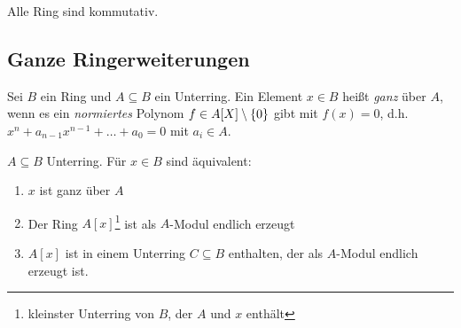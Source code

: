 \documentclass[../main.tex]{subfiles}
\begin{document}
Alle Ring sind kommutativ.
\subsection{Ganze Ringerweiterungen}
\begin{definition}
    Sei $B$ ein Ring und $A\subseteq B$ ein Unterring. Ein Element $x\in B$ heißt \emph{ganz} über $A$, wenn es ein \emph{normiertes} Polynom $f\in A[X]\setminus \{0\}$ gibt mit $f(x)=0$, d.h. $x^n + a_{n-1}x^{n-1} + \dots + a_0 = 0$ mit $a_i\in A$.
\end{definition}
\begin{theorem}
    $A\subseteq B$ Unterring. Für $x\in B$ sind äquivalent:
    \begin{enumerate}[label=(\roman*)]
        \item $x$ ist ganz über $A$
        \item Der Ring $A[x]$\footnote{kleinster Unterring von $B$, der $A$ und $x$ enthält} ist als $A$-Modul endlich erzeugt
        \item $A[x]$ ist in einem Unterring $C\subseteq B$ enthalten, der als $A$-Modul endlich erzeugt ist.
    \end{enumerate}
\end{theorem}
\end{document}
